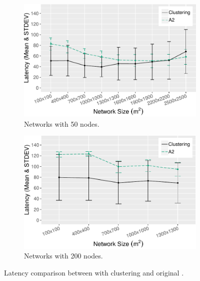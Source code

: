 \begin{figure}[bt]
    \centering
    \begin{subfigure}{0.7\textwidth}
        \centering
        \includegraphics[width=\textwidth]{figure/Results/ChaosComparison/ChaosComparison_50_Latency.pdf}
        \caption{Networks with 50 nodes.}
        \label{subfig:latency-50-nodes}
    \end{subfigure}
    \hfill
    \begin{subfigure}{0.7\textwidth}
        \centering
        \includegraphics[width=\textwidth]{figure/Results/ChaosComparison/ChaosComparison_200_Latency.pdf}
        \caption{Networks with 200 nodes.}
        \label{subfig:latency-200-nodes}
    \end{subfigure}
    \caption{Latency comparison between \atwo{} with clustering and original \atwo{}.}
    \label{fig:latency-results}
\end{figure}

